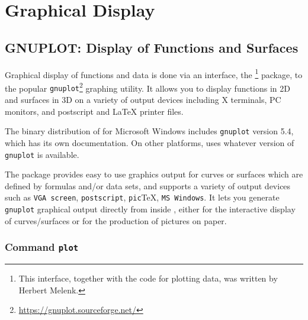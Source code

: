 \chapter{Graphical Display}


\section{GNUPLOT: Display of Functions and Surfaces}
\label{package:GNUPLOT}
\newcommand{\Gnuplot}{\texttt{gnuplot}}

Graphical display of functions and data is done via an interface, the
{\REDUCE} \footnote{This interface, together with the
code for plotting data, was written by Herbert Melenk.} package, to
the popular
{\Gnuplot}\footnote{\url{https://gnuplot.sourceforge.net/}} graphing
utility.  It allows you to display functions in 2D and surfaces in 3D
on a variety of output devices including X terminals, PC monitors, and
postscript and {\LaTeX} printer files.

The binary distribution of {\REDUCE} for Microsoft Windows includes
{\Gnuplot} version 5.4, which has its own documentation.  On other
platforms, {\REDUCE} uses whatever version of {\Gnuplot} is available.

The  package provides easy to use graphics output for
curves or surfaces which are defined by formulas and/or data sets, and
supports a variety of output devices such as \texttt{VGA screen},
\texttt{postscript}, \texttt{pic}\TeX, \texttt{MS Windows}.  It lets
you generate {\Gnuplot} graphical output directly from inside
{\REDUCE}, either for the interactive display of curves/surfaces or
for the production of pictures on paper.

\subsection{Command \texttt{plot}}
\hypertarget{command:PLOT}{}

